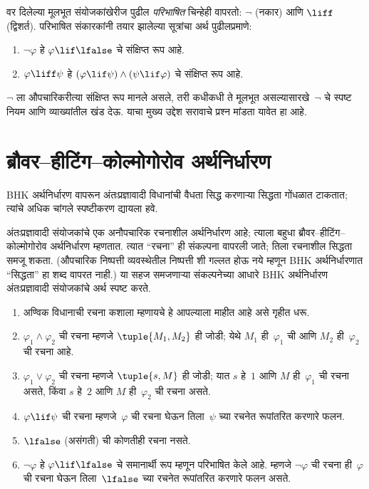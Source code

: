 वर दिलेल्या मूलभूत संयोजकांखेरीज पुढील
\emph{परिभाषित} चिन्हेही वापरतो: $\lnot$ (नकार)
आणि $\liff$ (द्विशर्त). परिभाषित
संकारकांनी तयार झालेल्या सूत्रांचा अर्थ पुढीलप्रमाणे:
\begin{enumerate}
\item $\lnot \varphi$ हे $\varphi \lif \lfalse$ चे संक्षिप्त रूप आहे.

\item $\varphi \liff \psi$ हे $(\varphi \lif \psi) \land (\psi
  \lif \varphi)$ चे संक्षिप्त रूप आहे.
\end{enumerate}

$\lnot$ ला औपचारिकरीत्या संक्षिप्त रूप मानले असले,
तरी कधीकधी ते मूलभूत असल्यासारखे~$\lnot$ चे स्पष्ट नियम
आणि व्याख्यांतील खंड देऊ. याचा मुख्य उद्देश सरावाचे
प्रश्न मांडता यावेत हा आहे.












\section{ब्रौवर--हीटिंग--कोल्मोगोरोव अर्थनिर्धारण}\label{int:int:bhk:sec}

\begin{editorial}
  BHK अर्थनिर्धारण वापरून अंतःप्रज्ञावादी विधानांची
  वैधता सिद्ध करणाऱ्या सिद्धता गोंधळात टाकतात;
  त्यांचे अधिक चांगले स्पष्टीकरण द्यायला हवे.
\end{editorial}

अंतःप्रज्ञावादी संयोजकांचे एक अनौपचारिक रचनाशील
अर्थनिर्धारण आहे; त्याला बहुधा ब्रौवर--हीटिंग--कोल्मोगोरोव
अर्थनिर्धारण म्हणतात. त्यात ``रचना'' ही संकल्पना
वापरली जाते; तिला रचनाशील सिद्धता समजू शकता.
(औपचारिक निष्पत्ती व्यवस्थेतील
निष्पत्ती शी गल्लत होऊ नये म्हणून BHK
अर्थनिर्धारणात ``सिद्धता'' हा शब्द वापरत नाही.)
या सहज समजणाऱ्या संकल्पनेच्या आधारे BHK अर्थनिर्धारण
अंतःप्रज्ञावादी संयोजकांचे अर्थ स्पष्ट करते.

\begin{enumerate}
\item अण्विक विधानाची रचना कशाला म्हणायचे हे आपल्याला
  माहीत आहे असे गृहीत धरू.
\item $\varphi_1 \land \varphi_2$ ची रचना म्हणजे $\tuple{M_1, M_2}$
  ही जोडी; येथे $M_1$ ही~$\varphi_1$ ची आणि $M_2$ ही~$\varphi_2$
  ची रचना आहे.
\item $\varphi_1 \lor \varphi_2$ ची रचना म्हणजे $\tuple{s, M}$
  ही जोडी; यात $s$ हे~$1$ आणि $M$ ही~$\varphi_1$ ची रचना
  असते, किंवा $s$ हे~$2$ आणि $M$ ही~$\varphi_2$ ची रचना
  असते.
\item $\varphi \lif \psi$ ची रचना म्हणजे~$\varphi$ ची रचना
  घेऊन तिला~$\psi$ च्या रचनेत रूपांतरित करणारे फलन.
\item $\lfalse$ (असंगती) ची कोणतीही रचना नसते.
\item $\lnot \varphi$ हे $\varphi \lif \lfalse$ चे समानार्थी रूप
  म्हणून परिभाषित केले आहे. म्हणजे $\lnot \varphi$ ची रचना
  ही~$\varphi$ ची रचना घेऊन तिला~$\lfalse$ च्या रचनेत
  रूपांतरित करणारे फलन असते.
\end{enumerate}

